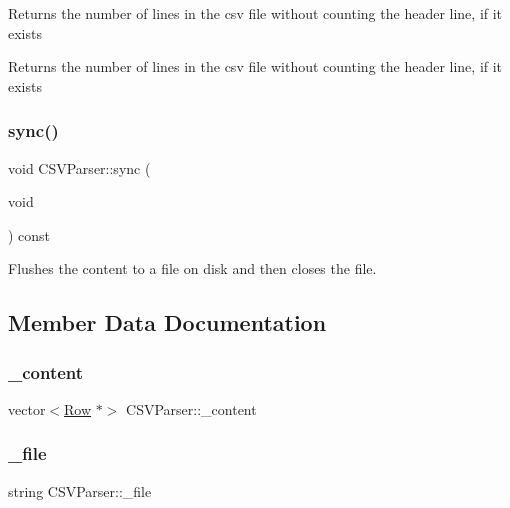 Returns the number of lines in the csv file without counting the header line, if it exists \begin{DoxyReturn}{Returns}
the number of lines in the csv file without counting the header line, if it exists 
\end{DoxyReturn}
\mbox{\label{class_c_s_v_parser_aa0b2494094eb2ce657787ae830b3cc52}} 
\subsubsection{\texorpdfstring{sync()}{sync()}}
{\footnotesize\ttfamily void C\+S\+V\+Parser\+::sync (\begin{DoxyParamCaption}\item[{void}]{ }\end{DoxyParamCaption}) const}

Flushes the content to a file on disk and then closes the file. 

\subsection{Member Data Documentation}
\mbox{\label{class_c_s_v_parser_adff6872f7e93cbc10797bac6173671d4}} 
\subsubsection{\texorpdfstring{\+\_\+content}{\_content}}
{\footnotesize\ttfamily vector$<$\hyperlink{class_row}{Row} $\ast$$>$ C\+S\+V\+Parser\+::\+\_\+content\hspace{0.3cm}{\ttfamily [private]}}

\mbox{\label{class_c_s_v_parser_a1db17c9285f8fdcaed2499747582e4a9}} 
\subsubsection{\texorpdfstring{\+\_\+file}{\_file}}
{\footnotesize\ttfamily string C\+S\+V\+Parser\+::\+\_\+file\hspace{0.3cm}{\ttfamily [private]}}


